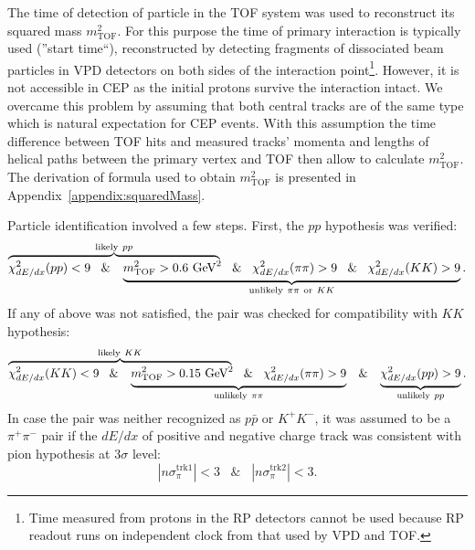 The time of detection of particle in the TOF system was used to reconstruct its squared mass $m^{2}_{\text{TOF}}$. For this purpose the time of primary interaction is typically used (''start time``), reconstructed by detecting fragments of dissociated beam particles in VPD detectors on both sides of the interaction point\footnote{Time measured from protons in the RP detectors cannot be used because RP readout runs on independent clock from that used by VPD and TOF.}. However, it is not accessible in CEP as the initial protons survive the interaction intact. We overcame this problem by assuming that both central tracks are of the same type which is natural expectation for CEP events. With this assumption the time difference between TOF hits and measured tracks' momenta and lengths of helical paths between the primary vertex and TOF then allow to calculate $m^{2}_{\text{TOF}}$. The derivation of formula used to obtain $m^{2}_{\text{TOF}}$ is presented in Appendix~\ref{appendix:squaredMass}.

Particle identification involved a few steps. First, the $pp$ hypothesis was verified:
\begin{equation}\label{eq:pidPPbar}\lefteqn{\overbrace{\phantom{\chi^{2}_{dE/dx}(pp)<9\;\;\; \& \;\;\; m^{2}_{\text{TOF}} > 0.6~\mbox{GeV}^{2}}}^{\text{likely}~pp}}\chi^{2}_{dE/dx}(pp)<9\;\;\; \& \;\;\; \underbrace{m^{2}_{\text{TOF}} > 0.6~\mbox{GeV}^{2}\;\;\; \& \;\;\; \chi^{2}_{dE/dx}(\pi\pi)>9\;\;\; \& \;\;\; \chi^{2}_{dE/dx}(KK)>9}_{\text{unlikely}~\pi\pi~\text{or}~KK}.\end{equation}
If any of above was not satisfied, the pair was checked for compatibility with $KK$ hypothesis:
%
\begin{equation}\label{eq:pidKK}%
\lefteqn{\overbrace{\phantom{\chi^{2}_{dE/dx}(KK)<9\;\;\; \& \;\;\; m^{2}_{\text{TOF}} > 0.15~\mbox{GeV}^{2}}}^{\text{likely}~KK}}\chi^{2}_{dE/dx}(KK)<9\;\;\; \& \;\;\; \underbrace{m^{2}_{\text{TOF}} > 0.15~\mbox{GeV}^{2}\;\;\; \& \;\;\; \chi^{2}_{dE/dx}(\pi\pi)>9}_{\text{unlikely}~\pi\pi}\;\;\; \& \;\;\; \underbrace{\chi^{2}_{dE/dx}(pp)>9}_{\text{unlikely}~pp}.
\end{equation}
%
In case the pair was neither recognized as $p\bar{p}$ or $K^{+}K^{-}$, it was assumed to be a $\pi^{+}\pi^{-}$ pair if the $dE/dx$ of positive and negative charge track was consistent with pion hypothesis at $3\sigma$ level:
\begin{equation}\label{eq:pidPiPi}|n\sigma_{\pi}^{\text{trk1}}|<3\;\;\; \& \;\;\; |n\sigma_{\pi}^{\text{trk2}}|<3.\end{equation}




